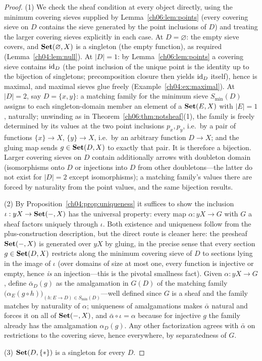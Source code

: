 \begin{proof}
(1) We check the sheaf condition at every object directly, using the
minimum covering sieves supplied by Lemma~\ref{ch06:lem:points} (every
covering sieve on $D$ contains the sieve generated by the point inclusions
of $D$) and treating the larger covering sieves explicitly in each case.
At $D=\varnothing$:
the empty sieve covers, and $\mathbf{Set}(\varnothing,X)$ is a singleton (the empty
function), as required (Lemma~\ref{ch04:lem:null}). At $|D|=1$: by
Lemma~\ref{ch06:lem:points} a covering sieve contains
$\mathrm{id}_D$ (the point inclusion of the unique point is the identity up to the
bijection of singletons; precomposition closure then yields $\mathrm{id}_D$ itself),
hence is maximal, and maximal sieves glue freely
(Example~\ref{ch04:ex:maximal}). At $|D|=2$, say $D=\{x,y\}$: a matching
family for the minimum sieve $S_{\min}(D)$ assigns to each singleton-domain
member an element of a $\mathbf{Set}(E,X)$ with $|E|=1$, naturally; unwinding as in
Theorem~\ref{ch06:thm:notsheaf}(1), the family is freely determined by its
values at the two point inclusions $p_x,p_y$, i.e.\ by a pair of functions
$\{x\}\to X$, $\{y\}\to X$, i.e.\ by an arbitrary function $D\to X$; and
the gluing map sends $g\in\mathbf{Set}(D,X)$ to exactly that pair. It is therefore
a bijection. Larger covering sieves on $D$ contain additionally arrows with
doubleton domain (isomorphisms onto $D$ or injections into $D$ from other
doubletons---the latter do not exist for $|D|=2$ except isomorphisms);
a matching family's values there are forced by naturality from the point
values, and the same bijection results.

(2) By Proposition~\ref{ch04:prop:uniqueness} it suffices to show the
inclusion $\iota:yX\to\mathbf{Set}(-,X)$ has the universal property: every map
$\alpha:yX\to G$ with $G$ a sheaf factors uniquely through $\iota$. Both
existence and uniqueness follow from the plus-construction description, but
the direct route is cleaner here: the presheaf $\mathbf{Set}(-,X)$ is generated
over $yX$ by gluing, in the precise sense that every section
$g\in\mathbf{Set}(D,X)$ restricts along the minimum covering sieve of $D$ to
sections lying in the image of $\iota$ (over domains of size at most one,
every function is injective or empty, hence \emph{is} an injection---this
is the pivotal smallness fact). Given $\alpha:yX\to G$, define
$\bar\alpha_D(g)$ as the amalgamation in $G(D)$ of the matching family
$\bigl(\alpha_E(g\circ h)\bigr)_{(h:E\to D)\in S_{\min}(D)}$---well
defined since $G$ is a sheaf and the family matches by naturality of
$\alpha$; uniqueness of amalgamations makes $\bar\alpha$ natural and forces
it on all of $\mathbf{Set}(-,X)$, and $\bar\alpha\circ\iota=\alpha$ because for
injective $g$ the family already has the amalgamation $\alpha_D(g)$. Any
other factorization agrees with $\bar\alpha$ on restrictions to the
covering sieve, hence everywhere, by separatedness of $G$.

(3) $\mathbf{Set}(D,\{*\})$ is a singleton for every $D$.
\end{proof}

